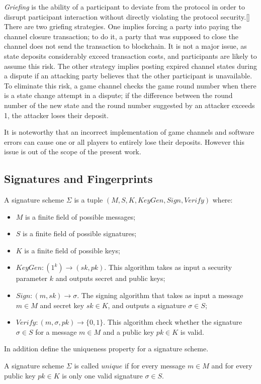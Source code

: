 \textit {Griefing} is the ability of a participant to deviate from the protocol in order to disrupt participant interaction without directly violating the protocol security.[] There are two griefing strategies. One implies forcing a party into paying the channel closure transaction; to do it, a party that was supposed to close the channel does not send the transaction to blockchain. It is not a major issue, as state deposits considerably exceed transaction costs, and participants are likely to assume this risk. The other strategy implies posting expired channel states during a dispute if an attacking party believes that the other participant is unavailable. To eliminate this risk, a game channel checks the game round number when there is a state change attempt in a dispute; if the difference between the round number of the new state and the round number suggested by an attacker exceeds 1, the attacker loses their deposit.

It is noteworthy that an incorrect implementation of game channels and software errors can cause one or all players to entirely lose their deposits. However this issue is out of the scope of the present work.

	\subsection{Signatures and Fingerprints}
\begin{defn}
A signature scheme $ \Sigma $ is a tuple $(M, S, K, KeyGen, Sign, Verify)$ where:
	\begin{itemize}
		\item $ M $ is a finite field of possible messages;
		\item $ S $ is a finite field of possible signatures;
		\item $ K $ is a finite field of possible keys;
		\item $ KeyGen: (1^k) \rightarrow (sk, pk) $. This algorithm takes as input a security parameter $k$ and outputs secret and public keys;
		\item $Sign: (m, sk) \rightarrow \sigma $. The signing algorithm that takes as input a message $m \in M$ and secret key $sk \in K$, and outputs a signature $\sigma \in S$;
	\item $Verify: (m, \sigma, pk) \rightarrow \{0, 1\} $. This algorithm check whether the signature $\sigma \in S$ for a message $m \in M$ and a public key $pk \in K$ is valid.
	\end{itemize}
\end{defn}
In addition define the uniqueness property for a signature scheme. 
\begin{defn}
A signature scheme $ \Sigma $ is called $unique$ if for every message $m \in M$ and for every public key $pk \in K$ is only one valid signature $\sigma \in S$.
\end{defn}

